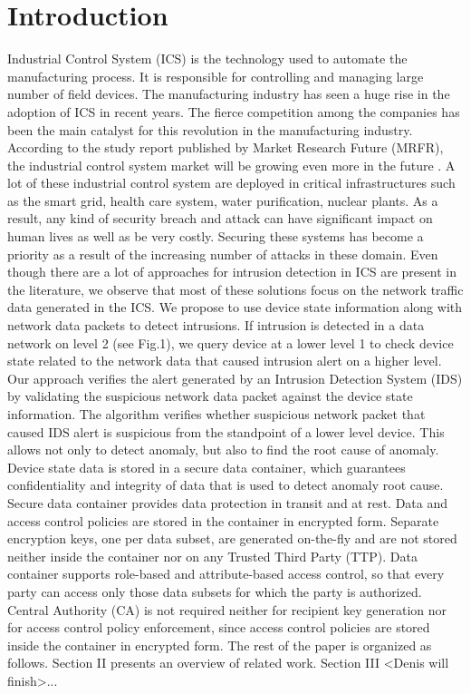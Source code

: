 \documentclass[conference]{IEEEtran}
\begin{document}
\section{Introduction}
Industrial Control System (ICS) is the technology used to automate the manufacturing process. It is responsible for controlling and managing large number of field devices. The manufacturing industry has seen a huge rise in the adoption of ICS in recent years. The fierce competition among the companies has been the main catalyst for this revolution in the manufacturing industry. According to the study report published by  Market Research Future (MRFR), the industrial control system market will be growing even more in the future \cite{c1}. A lot of these industrial control system are deployed in critical infrastructures such as the smart grid, health care system, water purification, nuclear plants. As a result, any kind of security breach and attack can have significant impact on human lives as well as be very costly. Securing these systems has become a priority as a result of the increasing number of attacks in these domain. 
Even though there are a lot of approaches for intrusion detection in ICS are present in the literature, we observe that most of these solutions focus on the network traffic data generated in the ICS. We propose to use device state information along with network data packets to detect intrusions. If intrusion is detected in a data network on level 2 (see Fig.1), we query device at a lower level 1 to check  device state related to the network data that caused intrusion alert on a higher level. Our approach verifies the alert generated by an Intrusion Detection System (IDS) by validating the suspicious network data packet against the device state information. The algorithm verifies whether suspicious network packet that caused IDS alert is suspicious from the standpoint of a lower level device. This allows not only to detect anomaly, but also to find the root cause of anomaly. Device state data is stored in a secure data container, which guarantees confidentiality and integrity of data that is used to detect anomaly root cause. Secure data container provides data protection in transit and at rest. Data and access control policies are stored in the container in encrypted form. Separate encryption keys, one per data subset, are generated on-the-fly and are not stored neither inside the container nor on any Trusted Third Party (TTP). Data container supports role-based and attribute-based access control, so that every party can access only those data subsets for which the party is authorized. Central Authority (CA) is not required neither for recipient key generation nor for access control policy enforcement, since access control policies are stored inside the container in encrypted form.      
The rest of the paper is organized as follows. Section II presents an overview of related work. Section III <Denis will finish>... 
\end{document}
